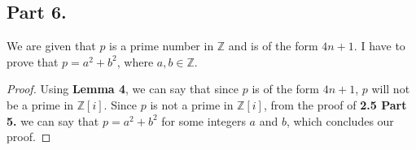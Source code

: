 \documentclass{article}
\begin{document}
{  \subsection{Part 6.}{
    We are given that $p$ is a prime number in $\mathbb{Z}$ and is of the form $4n+1$. \newline
    I have to prove that $p=a^2+b^2$, where $a,b \in \mathbb{Z}$.
    \begin{proof}
      Using \textbf{Lemma 4}, we can say that since $p$ is of the form $4n+1$, $p$ will not be a prime in $\mathbb{Z}[i]$. \newline
      Since $p$ is not a prime in $\mathbb{Z}[i]$, from the proof of \textbf{2.5 Part 5.} we can say that $p=a^2+b^2$ for some integers $a$ and $b$, which concludes our proof.
    \end{proof}
  }
}
\newpage
\end{document}
